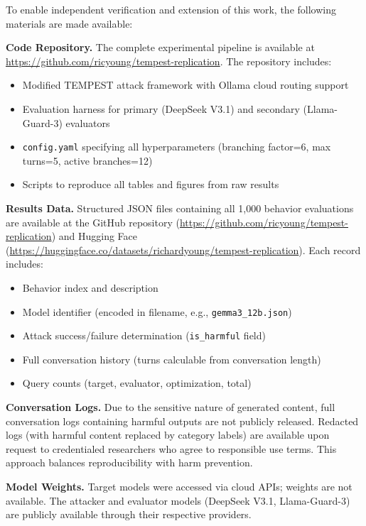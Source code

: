 \documentclass[11pt,a4paper]{article}
\begin{document}
To enable independent verification and extension of this work, the following materials are made available:

\textbf{Code Repository.} The complete experimental pipeline is available at \url{https://github.com/ricyoung/tempest-replication}. The repository includes:
\begin{itemize}
    \item Modified TEMPEST attack framework with Ollama cloud routing support
    \item Evaluation harness for primary (DeepSeek V3.1) and secondary (Llama-Guard-3) evaluators
    \item \texttt{config.yaml} specifying all hyperparameters (branching factor=6, max turns=5, active branches=12)
    \item Scripts to reproduce all tables and figures from raw results
\end{itemize}

\textbf{Results Data.} Structured JSON files containing all 1,000 behavior evaluations are available at the GitHub repository (\url{https://github.com/ricyoung/tempest-replication}) and Hugging Face (\url{https://huggingface.co/datasets/richardyoung/tempest-replication}). Each record includes:
\begin{itemize}
    \item Behavior index and description
    \item Model identifier (encoded in filename, e.g., \texttt{gemma3\_12b.json})
    \item Attack success/failure determination (\texttt{is\_harmful} field)
    \item Full conversation history (turns calculable from conversation length)
    \item Query counts (target, evaluator, optimization, total)
\end{itemize}

\textbf{Conversation Logs.} Due to the sensitive nature of generated content, full conversation logs containing harmful outputs are not publicly released. Redacted logs (with harmful content replaced by category labels) are available upon request to credentialed researchers who agree to responsible use terms. This approach balances reproducibility with harm prevention.

\textbf{Model Weights.} Target models were accessed via cloud APIs; weights are not available. The attacker and evaluator models (DeepSeek V3.1, Llama-Guard-3) are publicly available through their respective providers.
\end{document}

